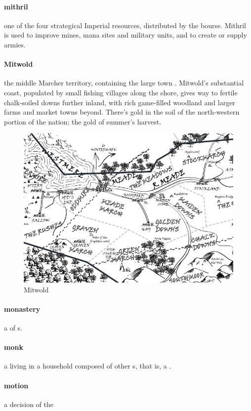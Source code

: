 \paragraph{mithril} one of the four strategical Imperial resources, distributed by the bourse. Mithril is used to improve mines, mana sites and military units, and to create or supply armies.
\paragraph{Mitwold} the middle Marcher territory, containing the large town . Mitwold's substantial  coast, populated by small fishing villages along the shore, gives way to fertile chalk-soiled downs further inland, with rich game-filled woodland and larger farms and market towns beyond. There's gold in the soil of the north-western portion of the nation; the gold of summer's harvest.\begin{figure}\centering\includegraphics[width=19.5cm,angle=90]{atlasofthemarches/Mitwold}\caption{Mitwold}\end{figure}
\paragraph{monastery} a  of s.
\paragraph{monk} a  living in a household composed of other s, that is, a .
\paragraph{motion} a decision of the 

